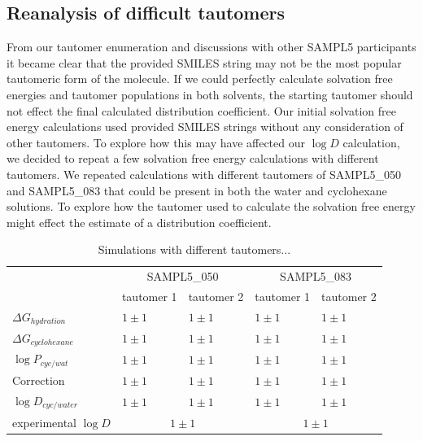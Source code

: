 \subsection{Reanalysis of difficult tautomers} %
\label{results:7}
From our tautomer enumeration and discussions with other SAMPL5 participants %
it became clear that the provided SMILES string may not be the most popular %
tautomeric form of the molecule. 
If we could perfectly calculate solvation free energies and tautomer populations in both solvents, the starting tautomer should not effect the final calculated distribution coefficient.  
Our initial solvation free energy calculations used provided SMILES strings without any consideration of other tautomers.
To explore how this may have affected our $\log D$ calculation, we decided to repeat a few solvation free energy calculations with different tautomers. 
We repeated calculations with different tautomers of SAMPL5\_050 and SAMPL5\_083 that could be present in both the water and cyclohexane solutions. 
To explore how the tautomer used to calculate the solvation free energy might effect the estimate of a distribution coefficient. 

\begin{table}
\begin{tabular}{l | l l | l l}
\hline
& \multicolumn{2}{|c|}{SAMPL5\_050} & \multicolumn{2}{c}{SAMPL5\_083} \\
& tautomer 1 & tautomer 2 & tautomer 1 & tautomer 2 \\
\hline
$\Delta G_{hydration}$ & $ 1 \pm 1 $ &  $ 1 \pm 1$ &  $1 \pm 1$ &  $1 \pm 1$ \\
$\Delta G_{cyclohexane}$ & $ 1 \pm 1 $ &  $ 1 \pm 1$ &  $1 \pm 1$ &  $1 \pm 1$ \\
$\log P_{cyc/wat}$ & $ 1 \pm 1 $ &  $ 1 \pm 1$ &  $1 \pm 1$ &  $1 \pm 1$ \\
Correction & $ 1 \pm 1 $ &  $ 1 \pm 1$ &  $1 \pm 1$ &  $1 \pm 1$ \\
$\log D_{cyc/water}$ & $ 1 \pm 1 $ &  $ 1 \pm 1$ &  $1 \pm 1$ &  $1 \pm 1$ \\
\hline
experimental $\log D$ & \multicolumn{2}{|c|}{$1 \pm 1$} & \multicolumn{2}{c}{$1 \pm 1$} \\
\hline
\end{tabular}
\label{tautomerChanges}
\caption{Simulations with different tautomers...}
\end{table}


